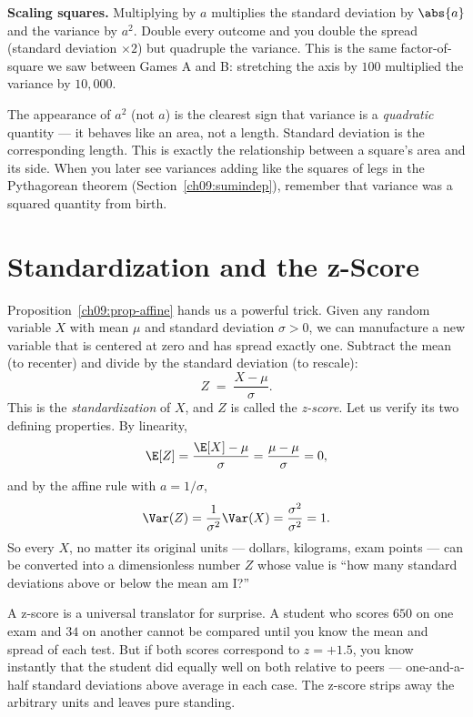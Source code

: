 \textbf{Scaling squares.} Multiplying by $a$ multiplies the standard
deviation by $\abs{a}$ and the variance by $a^2$. Double every outcome and you
double the spread (standard deviation $\times 2$) but quadruple the variance.
This is the same factor-of-square we saw between Games A and B: stretching the
axis by $100$ multiplied the variance by $10{,}000$.

\begin{happeningbox}
The appearance of $a^2$ (not $a$) is the clearest sign that variance is a
\emph{quadratic} quantity --- it behaves like an area, not a length. Standard
deviation is the corresponding length. This is exactly the relationship
between a square's area and its side. When you later see variances adding like
the squares of legs in the Pythagorean theorem
(Section~\ref{ch09:sumindep}), remember that variance was a squared quantity
from birth.
\end{happeningbox}

\section{Standardization and the z-Score}
\label{ch09:zscore}

Proposition~\ref{ch09:prop-affine} hands us a powerful trick. Given any
random variable $X$ with mean $\mu$ and standard deviation $\sigma > 0$, we
can manufacture a new variable that is centered at zero and has spread
exactly one. Subtract the mean (to recenter) and divide by the standard
deviation (to rescale):
\[
  Z \;=\; \frac{X - \mu}{\sigma}.
\]
This is the \emph{standardization} of $X$, and $Z$ is called the
\emph{z-score}. Let us verify its two defining properties. By linearity,
\[
  \E[Z] = \frac{\E[X] - \mu}{\sigma} = \frac{\mu - \mu}{\sigma} = 0,
\]
and by the affine rule with $a = 1/\sigma$,
\[
  \Var(Z) = \frac{1}{\sigma^2}\Var(X) = \frac{\sigma^2}{\sigma^2} = 1.
\]
So every $X$, no matter its original units --- dollars, kilograms, exam
points --- can be converted into a dimensionless number $Z$ whose value is
``how many standard deviations above or below the mean am I?''

\begin{intuitionbox}
A z-score is a universal translator for surprise. A student who scores $650$
on one exam and $34$ on another cannot be compared until you know the mean and
spread of each test. But if both scores correspond to $z = +1.5$, you know
instantly that the student did equally well on both relative to peers ---
one-and-a-half standard deviations above average in each case. The z-score
strips away the arbitrary units and leaves pure standing.
\end{intuitionbox}


